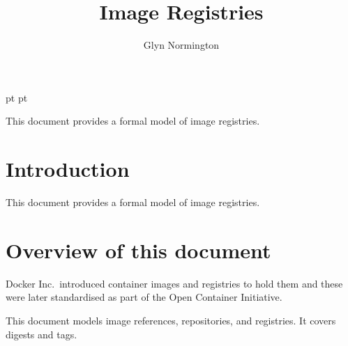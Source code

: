 \documentclass[a4paper,twoside,12pt]{article}
\begin{document}
 pt
 pt

\def\Slash{\slash\hspace{0pt}}

\title{Image Registries}

\author{Glyn Normington}

\maketitle
\thispagestyle{empty}
\setcounter{page}{1}


This document provides a formal model of image registries.


\newcommand{\true}{true}
\newcommand{\false}{false}
\renewcommand{\emptyset}{\varnothing}

\clearpage
\tableofcontents

\cleardoublepage
{}
\setcounter{page}{1}

\section{Introduction}

This document provides a formal model of image registries.

\section{Overview of this document}

Docker Inc.\ introduced container images and registries to hold them and these were later standardised as part of the Open Container Initiative.

This document models image references, repositories, and registries. It covers digests and tags.
\end{document}
